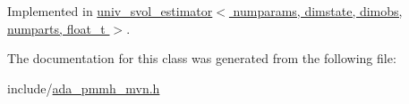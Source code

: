 Implemented in \hyperlink{classuniv__svol__estimator_a2e0e55bf061ca8f59fa5d42ae6495fdd}{univ\+\_\+svol\+\_\+estimator$<$ numparams, dimstate, dimobs, numparts, float\+\_\+t $>$}.



The documentation for this class was generated from the following file\+:\begin{DoxyCompactItemize}
\item 
include/\hyperlink{ada__pmmh__mvn_8h}{ada\+\_\+pmmh\+\_\+mvn.\+h}\end{DoxyCompactItemize}
